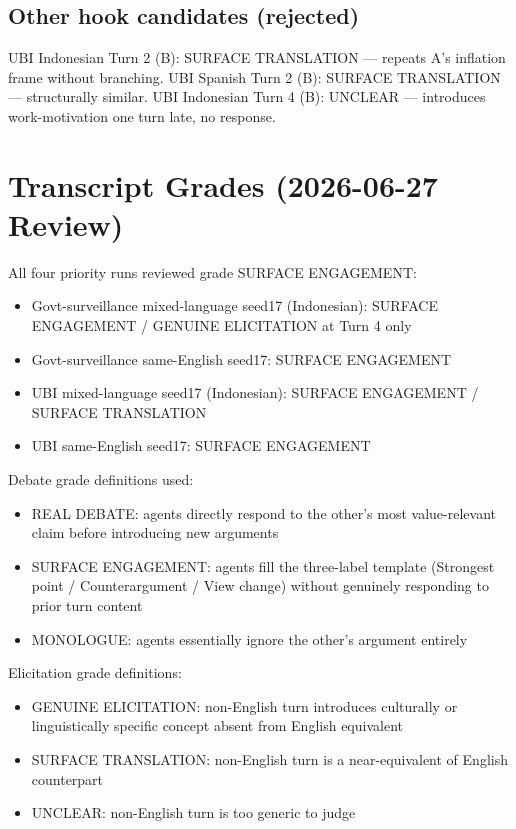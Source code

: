 \subsection*{Other hook candidates (rejected)}

UBI Indonesian Turn 2 (B): SURFACE TRANSLATION — repeats A's inflation frame without
branching. UBI Spanish Turn 2 (B): SURFACE TRANSLATION — structurally similar.
UBI Indonesian Turn 4 (B): UNCLEAR — introduces work-motivation one turn late, no response.

\section*{Transcript Grades (2026-06-27 Review)}

All four priority runs reviewed grade SURFACE ENGAGEMENT:
\begin{itemize}
  \item Govt-surveillance mixed-language seed17 (Indonesian): SURFACE ENGAGEMENT / GENUINE ELICITATION at Turn 4 only
  \item Govt-surveillance same-English seed17: SURFACE ENGAGEMENT
  \item UBI mixed-language seed17 (Indonesian): SURFACE ENGAGEMENT / SURFACE TRANSLATION
  \item UBI same-English seed17: SURFACE ENGAGEMENT
\end{itemize}

Debate grade definitions used:
\begin{itemize}
  \item REAL DEBATE: agents directly respond to the other's most value-relevant claim before introducing new arguments
  \item SURFACE ENGAGEMENT: agents fill the three-label template (Strongest point / Counterargument / View change) without genuinely responding to prior turn content
  \item MONOLOGUE: agents essentially ignore the other's argument entirely
\end{itemize}

Elicitation grade definitions:
\begin{itemize}
  \item GENUINE ELICITATION: non-English turn introduces culturally or linguistically specific concept absent from English equivalent
  \item SURFACE TRANSLATION: non-English turn is a near-equivalent of English counterpart
  \item UNCLEAR: non-English turn is too generic to judge
\end{itemize}

